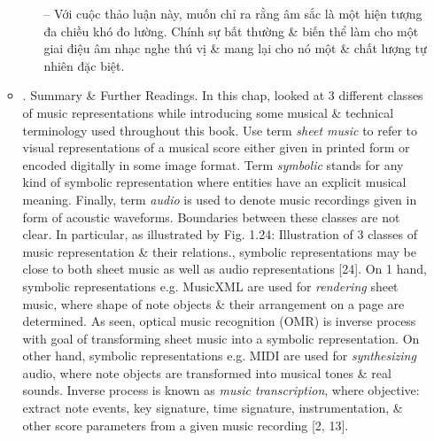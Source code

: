 \documentclass{article}
\begin{document}
\begin{itemize}
\begin{itemize}
\begin{itemize}
			-- Với cuộc thảo luận này, muốn chỉ ra rằng âm sắc là một hiện tượng đa chiều khó đo lường. Chính sự bất thường \& biến thể làm cho một giai điệu âm nhạc nghe thú vị \& mang lại cho nó một \& chất lượng tự nhiên đặc biệt.
		\end{itemize}
		\item {. Summary \& Further Readings.} In this chap, looked at 3 different classes of music representations while introducing some musical \& technical terminology used throughout this book. Use term {\it sheet music} to refer to visual representations of a musical score either given in printed form or encoded digitally in some image format. Term {\it symbolic} stands for any kind of symbolic representation where entities have an explicit musical meaning. Finally, term {\it audio} is used to denote music recordings given in form of acoustic waveforms. Boundaries between these classes are not clear. In particular, as illustrated by {\sf Fig. 1.24: Illustration of 3 classes of music representation \& their relations.}, symbolic representations may be close to both sheet music as well as audio representations [24]. On 1 hand, symbolic representations e.g. MusicXML are used for {\it rendering} sheet music, where shape of note objects \& their arrangement on a page are determined. As seen, optical music recognition (OMR) is inverse process with goal of transforming sheet music into a symbolic representation. On other hand, symbolic representations e.g. MIDI are used for {\it synthesizing} audio, where note objects are transformed into musical tones \& real sounds. Inverse process is known as {\it music transcription}, where objective: extract note events, key signature, time signature, instrumentation, \& other score parameters from a given music recording [2, 13].
		

\end{itemize}
\end{itemize}
\end{document}
